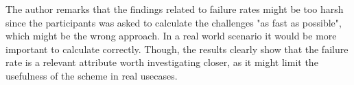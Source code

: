 

\begin{remark}
    The author remarks that the findings related to failure rates might be too harsh since the participants was asked to calculate the challenges "as fast as possible", which might be the wrong approach. In a real world scenario it would be more important to calculate correctly. Though, the results clearly show that the failure rate is a relevant attribute worth investigating closer, as it might limit the usefulness of the scheme in real usecases.
\end{remark}



